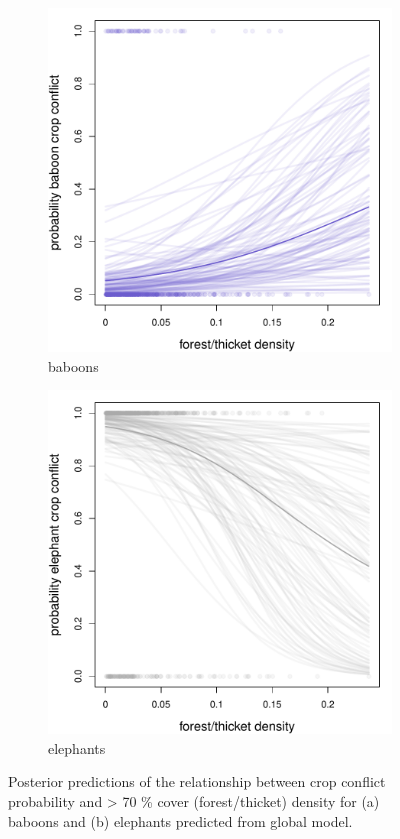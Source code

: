 \documentclass[12pt,]{article}
\begin{document}
\begin{figure}[H]
  \centering
	\begin{subfigure}[b]{0.49\textwidth}
	\includegraphics[width=\textwidth]{Figures/c70_crop_global_conflict_bab.pdf} 
    \caption{baboons}
   	    \label{fig:cropC70bab}
\end{subfigure}
\begin{subfigure}[b]{0.49\textwidth}
	\includegraphics[width=\textwidth]{Figures/c70_crop_global_conflict_ele.pdf}  
    \caption{elephants}
  	\label{fig:cropC70ele}
\end{subfigure}
\caption{Posterior predictions of the relationship between crop conflict probability and > 70 \% cover (forest/thicket) density for (a) baboons and (b) elephants predicted from global model.}
\end{figure}
\end{document}
